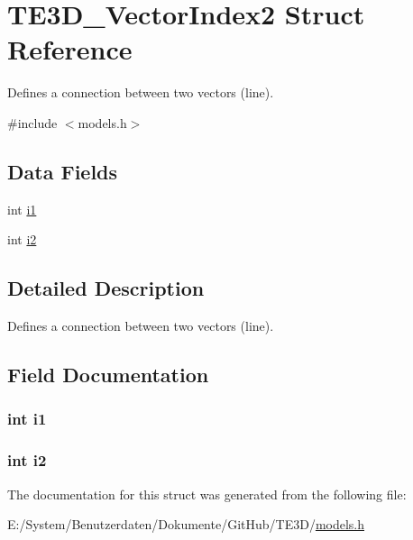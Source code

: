 \hypertarget{struct_t_e3_d___vector_index2}{\section{T\-E3\-D\-\_\-\-Vector\-Index2 Struct Reference}
\label{struct_t_e3_d___vector_index2}
}


Defines a connection between two vectors (line).  




{\ttfamily \#include $<$models.\-h$>$}

\subsection*{Data Fields}
\begin{DoxyCompactItemize}
\item 
int \hyperlink{struct_t_e3_d___vector_index2_ac1148b6c7c73300331ae93335f42241d}{i1}
\item 
int \hyperlink{struct_t_e3_d___vector_index2_a48d37c88961428889f8b283379ab961c}{i2}
\end{DoxyCompactItemize}


\subsection{Detailed Description}
Defines a connection between two vectors (line). 

\subsection{Field Documentation}
\hypertarget{struct_t_e3_d___vector_index2_ac1148b6c7c73300331ae93335f42241d}{
\subsubsection[{i1}]{\setlength{\rightskip}{0pt plus 5cm}int i1}}\label{struct_t_e3_d___vector_index2_ac1148b6c7c73300331ae93335f42241d}
\hypertarget{struct_t_e3_d___vector_index2_a48d37c88961428889f8b283379ab961c}{
\subsubsection[{i2}]{\setlength{\rightskip}{0pt plus 5cm}int i2}}\label{struct_t_e3_d___vector_index2_a48d37c88961428889f8b283379ab961c}


The documentation for this struct was generated from the following file\-:\begin{DoxyCompactItemize}
\item 
E\-:/\-System/\-Benutzerdaten/\-Dokumente/\-Git\-Hub/\-T\-E3\-D/\hyperlink{models_8h}{models.\-h}\end{DoxyCompactItemize}
